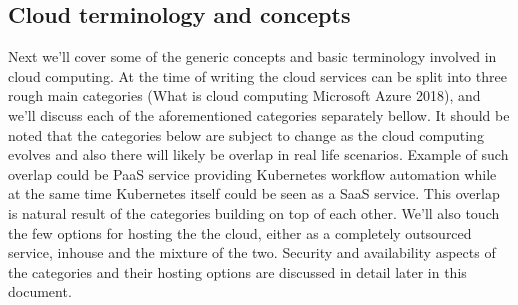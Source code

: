 \documentclass{article}
\begin{document}
\subsection{Cloud terminology and concepts}
Next we'll cover some of the generic concepts and basic terminology involved in cloud computing.
At the time of writing the cloud services can be split into three rough main categories (What is cloud computing Microsoft Azure 2018), and we'll discuss each of the aforementioned categories separately bellow. It should be noted that the categories below are subject to change as the cloud computing evolves and also there will likely be overlap in real life scenarios. Example of such overlap could be PaaS service providing Kubernetes workflow automation while at the same time Kubernetes itself could be seen as a SaaS service.
This overlap is natural result of the categories building on top of each other.
We'll also touch the few options for hosting the the cloud, either as a completely outsourced service, inhouse and the mixture of the two.
Security and availability aspects of the categories and their hosting options are discussed in detail later in this document. 
\end{document}
